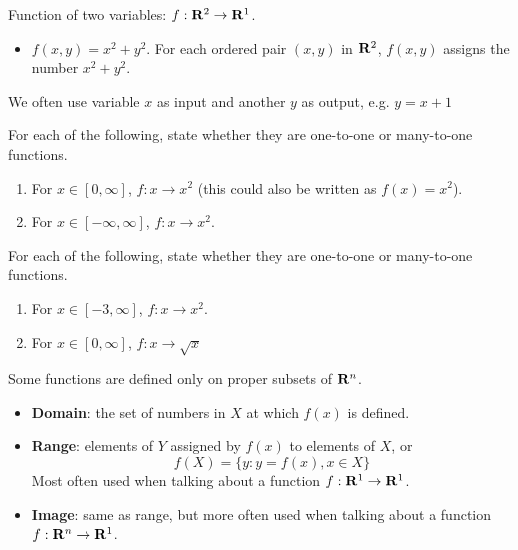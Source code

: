 \documentclass[]{book}
\providecommand{\tightlist}{%
  \setlength{\itemsep}{0pt}\setlength{\parskip}{0pt}}
\theoremstyle{definition}
\theoremstyle{definition}
\theoremstyle{definition}
\theoremstyle{remark}
\let\BeginKnitrBlock\begin \let\EndKnitrBlock\end
\begin{document}
Function of two variables: \(f: {\bf R}^2\to{\bf R}^1\).

\begin{itemize}
\tightlist
\item
  \(f(x,y)=x^2+y^2\). For each ordered pair \((x,y)\) in \({\bf R}^2\),
  \(f(x,y)\) assigns the number \(x^2+y^2\).
\end{itemize}

We often use variable \(x\) as input and another \(y\) as output, e.g.
\(y=x+1\)

\BeginKnitrBlock{example}[Functions]
\protect\hypertarget{exm:functions}{}{\label{exm:functions}
{} } For each of the following, state whether
they are one-to-one or many-to-one functions.

\begin{enumerate}
\def\labelenumi{\arabic{enumi}.}
\item
  For \(x \in [0,\infty]\), \(f : x \rightarrow x^2\) (this could also
  be written as \(f(x) = x^2\)).
\item
  For \(x \in [-\infty, \infty]\), \(f: x \rightarrow x^2\).
\end{enumerate}
\EndKnitrBlock{example}

\BeginKnitrBlock{exercise}[Functions]
\protect\hypertarget{exr:functions1}{}{\label{exr:functions1}
{} } For each of the following, state whether
they are one-to-one or many-to-one functions.

\begin{enumerate}
\def\labelenumi{\arabic{enumi}.}
\item
  For \(x \in [-3, \infty]\), \(f: x \rightarrow x^2\).
\item
  For \(x \in [0, \infty]\), \(f: x \rightarrow \sqrt{x}\)
\end{enumerate}
\EndKnitrBlock{exercise}

Some functions are defined only on proper subsets of \({\bf R}^n\).

\begin{itemize}
\tightlist
\item
  \textbf{Domain}: the set of numbers in \(X\) at which \(f(x)\) is
  defined.
\item
  \textbf{Range}: elements of \(Y\) assigned by \(f(x)\) to elements of
  \(X\), or \[f(X)=\{ y : y=f(x), x\in X\}\] Most often used when
  talking about a function \(f:{\bf R}^1\to{\bf R}^1\).
\item
  \textbf{Image}: same as range, but more often used when talking about
  a function \(f:{\bf R}^n\to{\bf R}^1\).
\end{itemize}
\end{document}
